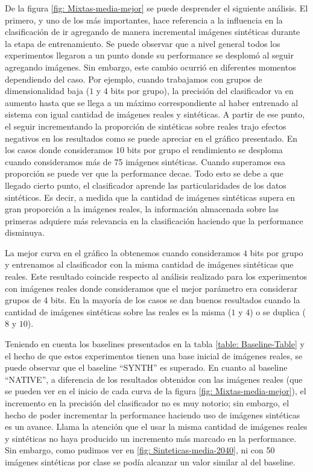 	De la figura \ref{fig: Mixtas-media-mejor} se puede desprender el siguiente análisis. El primero, y uno de los más importantes, hace referencia a la influencia en la clasificación de ir agregando de manera incremental imágenes sintéticas durante la etapa de entrenamiento. Se puede observar que a nivel general todos los experimentos llegaron a un punto donde su performance se desplomó al seguir agregando imágenes. Sin embargo, este cambio ocurrió en diferentes momentos dependiendo del caso. Por ejemplo, cuando trabajamos con grupos de dimensionalidad baja ($1$ y $4$ bits por grupo), la precisión del clasificador va en aumento hasta que se llega a un máximo correspondiente al haber entrenado al sistema con igual cantidad de imágenes reales y sintéticas. A partir de ese punto, el seguir incrementando la proporción de sintéticas sobre reales trajo efectos negativos en los resultados como se puede apreciar en el gráfico presentado. En los casos donde consideramos $10$ bits por grupo el rendimiento se desploma cuando consideramos más de 75 imágenes sintéticas. Cuando superamos esa proporción se puede ver que la performance decae. Todo esto se debe a que llegado cierto punto, el clasificador aprende las particularidades de los datos sintéticos. Es decir, a medida que la cantidad de imágenes sintéticas supera en gran proporción a la imágenes reales, la información almacenada sobre las primeras adquiere más relevancia en la clasificación haciendo que la performance disminuya.

	 La mejor curva en el gráfico la obtenemos cuando consideramos $4$ bits por grupo y entrenamos al clasificador con la misma cantidad de imágenes sintéticas que reales. Este resultado coincide respecto al análisis realizado para los experimentos con imágenes reales donde consideramos que el mejor parámetro era considerar grupos de $4$ bits. En la mayoría de los casos se dan buenos resultados cuando la cantidad de imágenes sintéticas sobre las reales es la misma ($1$ y $4$) o se duplica ($8$ y $10$).

	 Teniendo en cuenta los baselines presentados en la tabla \ref{table: Baseline-Table} y el hecho de que estos experimentos tienen una base inicial de imágenes reales, se puede observar que el baseline ``SYNTH'' es superado. En cuanto al baseline ``NATIVE'', a diferencia de los resultados obtenidos con las imágenes reales (que se pueden ver en el inicio de cada curva de la figura \ref{fig: Mixtas-media-mejor}), el incremento en la precisión del clasificador no es muy notorio; sin embargo, el hecho de poder incrementar la performance haciendo uso de imágenes sintéticas es un avance. Llama la atención que el usar la misma cantidad de imágenes reales y sintéticas no haya producido un incremento más marcado en la performance. Sin embargo, como pudimos ver en \ref{fig: Sinteticas-media-2040}, ni con 50 imágenes sintéticas por clase se podía alcanzar un valor similar al del baseline.

